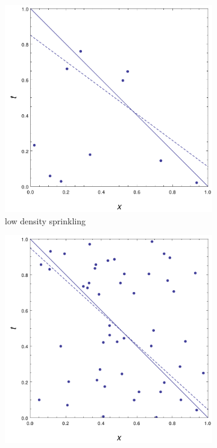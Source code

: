 \documentclass[12pt]{article}
\begin{document}
\begin{figure}
        \centering
        \begin{subfigure}[b]{0.49\textwidth}
                \includegraphics[width=\textwidth]{low_density_sprinkling_with_null_and_spacelike}
                \caption{low density sprinkling}
                \label{fig:low_density_sprinkling_with_null_and_spacelike}
        \end{subfigure}
        \begin{subfigure}[b]{0.49\textwidth}
                \includegraphics[width=\textwidth]{high_density_sprinkling_with_null_and_spacelike}

\end{subfigure}
\end{figure}
\end{document}
